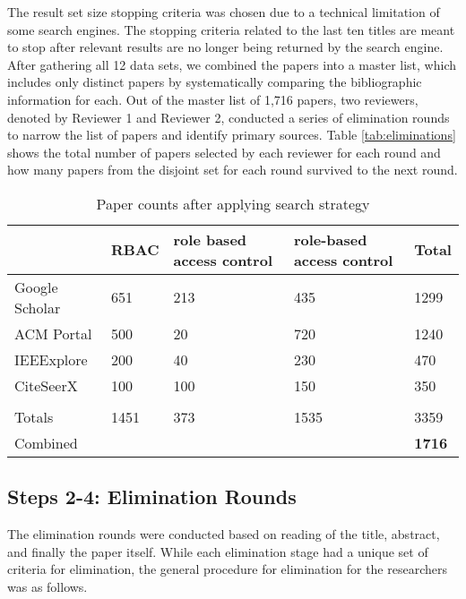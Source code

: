 The result set size stopping criteria was chosen due to a technical limitation of some search engines.  The stopping criteria related to the last ten titles are meant to stop after relevant results are no longer being returned by the search engine.  After gathering all 12 data sets, we combined the papers into a master list, which includes only distinct papers by systematically comparing the bibliographic information for each.
Out of the master list of 1,716 papers, two reviewers, denoted by Reviewer 1 and Reviewer 2, conducted a series of elimination rounds to narrow the list of papers and identify primary sources. Table \ref{tab:eliminations} shows the total number of papers selected by each reviewer for each round and how many papers from the disjoint set for each round survived to the next round.

\begin{table}
\centering
\caption{Paper counts after applying search strategy}
\begin{tabular}{|p{3.5cm}|p{1.25cm}|p{4.25cm}|p{4.25cm}|p{1cm}|}

\hline
 & 
\textbf{RBAC} & 
\textbf{role based access control} & 
\textbf{role-based access control} & 
\textbf{Total}
\\\hline

Google Scholar & 651 & 213 & 435 & 1299 \\\hline
ACM Portal & 500 & 20 & 720 & 1240 \\\hline
IEEExplore & 200 & 40 & 230 & 470 \\\hline
CiteSeerX & 100 & 100 & 150 & 350 \\\hline
 &  &  &  & \\\hline
Totals & 1451 & 373 & 1535 & 3359 \\\hline
Combined &  &  &  & \textbf{1716} \\\hline

\end{tabular}
\label{tab:search_results}
\end{table}

\subsection{Steps 2-4: Elimination Rounds}

The elimination rounds were conducted based on reading of the title, abstract, and finally the paper itself.  While each elimination stage had a unique set of criteria for elimination, the general procedure for elimination for the researchers was as follows.

